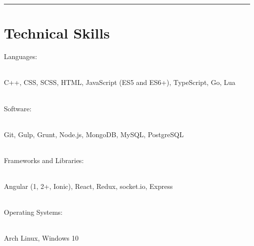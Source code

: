 \noindent\rule{0.9\hsize}{0.4pt}
\section{\normalsize{Technical Skills}}

Languages:\\\\
\parbox{\dimexpr\linewidth-2\fboxsep-2\fboxrule}{C++, CSS, SCSS, HTML, JavaScript (ES5 and ES6+), TypeScript, Go, Lua}
\vspace{2\baselineskip}
\\
Software:\\\\
\parbox{\dimexpr\linewidth-2\fboxsep-2\fboxrule}{Git, Gulp, Grunt, Node.js, MongoDB, MySQL, PostgreSQL}
\vspace{2\baselineskip}
\\
Frameworks and Libraries:\\\\
\parbox{\dimexpr\linewidth-2\fboxsep-2\fboxrule}{Angular (1, 2+, Ionic), React, Redux, socket.io, Express}
\vspace{2\baselineskip}
\\
Operating Systems:\\\\
\parbox{\dimexpr\linewidth-2\fboxsep-2\fboxrule}{Arch Linux, Windows 10}
\\